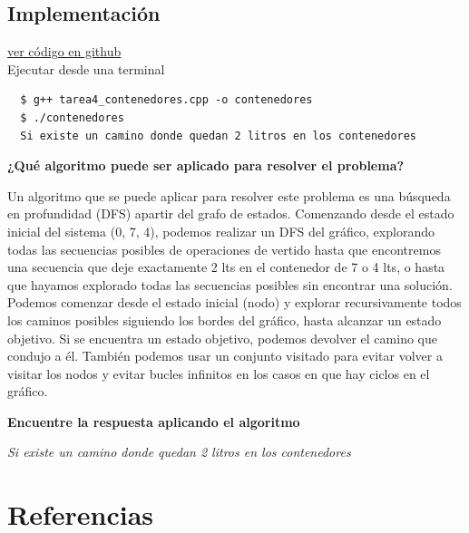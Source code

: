 \documentclass{article}
\begin{document}
\subsection{Implementación}
\href{https://github.com/luisballado/ADA/blob/main/practice_code/tarea1.cpp}{ver código en github}\\

Ejecutar desde una terminal

\begin{commandline}
\begin{verbatim}
  $ g++ tarea4_contenedores.cpp -o contenedores
  $ ./contenedores
  Si existe un camino donde quedan 2 litros en los contenedores
\end{verbatim}
\end{commandline}

\begin{question}
  \textbf{¿Qué algoritmo puede ser aplicado para resolver el problema?}\\
\end{question}

Un algoritmo que se puede aplicar para resolver este problema es una búsqueda en profundidad (DFS) apartir del grafo de estados. Comenzando desde el estado inicial del sistema (0, 7, 4), podemos realizar un DFS del gráfico, explorando todas las secuencias posibles de operaciones de vertido hasta que encontremos una secuencia que deje exactamente 2 lts en el contenedor de  7 o 4 lts, o hasta que hayamos explorado todas las secuencias posibles sin encontrar una solución.\\

Podemos comenzar desde el estado inicial (nodo) y explorar recursivamente todos los caminos posibles siguiendo los bordes del gráfico, hasta alcanzar un estado objetivo. Si se encuentra un estado objetivo, podemos devolver el camino que condujo a él. También podemos usar un conjunto visitado para evitar volver a visitar los nodos y evitar bucles infinitos en los casos en que hay ciclos en el gráfico.\\

\begin{question}
  \textbf{Encuentre la respuesta aplicando el algoritmo}\\
\end{question}
\textit{Si existe un camino donde quedan 2 litros en los contenedores}

\section{Referencias}

\end{document}
